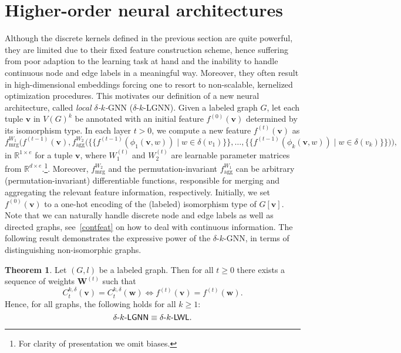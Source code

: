 \documentclass{article}
\theoremstyle{definition}
\newtheorem{theorem}{Theorem}
\newcommand{\new}[1]{\emph{#1}}
\newcommand{\bbR}{\ensuremath{\mathbb{R}}}
\newcommand{\oms}{\{\!\!\{}
\newcommand{\cms}{\}\!\!\}}
\renewcommand{\vec}[1]{\mathbf{#1}}
\newcommand{\localkwl}{$\delta$-$k$-\textsf{LWL}\xspace}
\newcommand{\deltakwln}{$\delta$-$k$-\textsf{GNN}\xspace}
\newcommand{\localkwln}{$\delta$-$k$-\textsf{LGNN}\xspace}
\begin{document}
\section{Higher-order neural architectures}\label{neural}
Although the discrete kernels defined in the previous section are quite powerful, they are limited due to their fixed feature construction scheme, hence suffering from poor adaption to the learning task at hand and the inability to handle continuous node and edge labels in a meaningful way. Moreover, they often result in high-dimensional embeddings forcing one to resort to non-scalable, kernelized optimization procedures. 
This motivates our definition of a new neural architecture, called \new{local $\delta$-$k$-}\textsf{GNN} (\localkwln).
Given a labeled graph $G$, let each tuple $\vec{v}$ in $V(G)^k$ be annotated with an initial feature $f^{(0)}(\vec{v})$ determined by its isomorphism type. 
In each layer $t > 0$,  we compute a new feature $f^{(t)}(\vec{v})$ as 
\begin{equation*}\label{gnngeneral}
f^{W_1}_{\text{mrg}}\Big(f^{(t-1)}(\vec{v}) ,f^{W_2}_{\text{agg}}\big(\oms f^{(t-1)}(\phi_1(\vec{v},w)) \mid w \in \delta(v_1)\cms, \dots, \oms f^{(t-1)}(\phi_k(\vec{v},w)) \mid w \in \delta(v_k) \cms \big) \!\Big),
\end{equation*}
in  $\bbR^{1 \times e}$ for a tuple $\vec{v}$, where $W_1^{(t)}$ and $W_2^{(t)}$ are learnable parameter matrices from $\bbR^{d \times e}$.\footnote{For clarity of presentation we omit biases.}. Moreover, $f^{W_2}_{\text{mrg}}$ and the permutation-invariant $f^{W_1}_{\text{agg}}$ can be arbitrary (permutation-invariant) differentiable functions, responsible for merging and aggregating the relevant feature information, respectively. Initially, we set $f^{(0)}(\vec{v})$ to a one-hot encoding of the (labeled) isomorphism type of $G[\vec{v}]$. Note that we can naturally handle discrete node and edge labels as well as directed graphs, see~\cref{contfeat} on how to deal with continuous information. The following result demonstrates the expressive power of the \deltakwln, in terms of distinguishing non-isomorphic graphs. 
\begin{theorem}\label{equal}
	Let $(G, l)$ be a labeled graph. Then for all \mbox{$t\geq 0$} there exists a sequence of weights $\mathbf{W}^{(t)}$ such that 
	\begin{equation*}
	C^{k,\delta}_{t}(\vec{v}) = C^{k,\delta}_{t}(\vec{w}) \iff f^{(t)}(\vec{v}) = f^{(t)}(\vec{w}).
	\end{equation*}
	Hence, for all graphs, the following holds for all $k \geq 1$:
	\begin{equation*}
	\text{\localkwln} \equiv \text{\localkwl}.
	\end{equation*}
\end{theorem}     
\end{document}
